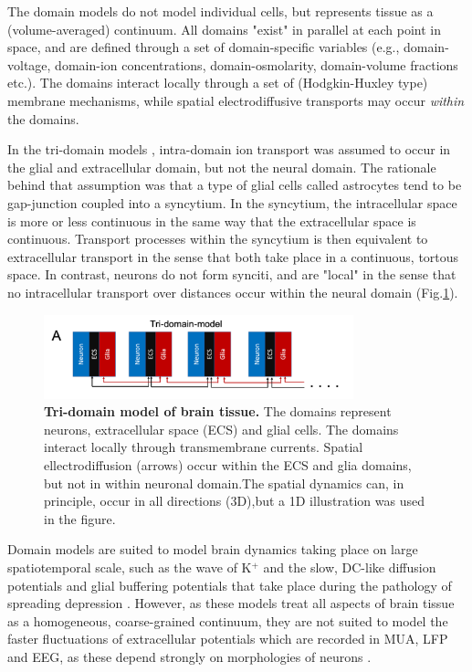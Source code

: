 The domain models do not model individual cells, but represents tissue as a (volume-averaged) continuum. All domains "exist" in parallel at each point in space, and are defined through a set of domain-specific variables (e.g., domain-voltage, domain-ion concentrations, domain-osmolarity, domain-volume fractions etc.). The domains interact locally through a set of (Hodgkin-Huxley type) membrane mechanisms, while spatial electrodiffusive transports may occur \textit{within} the domains. 

In the tri-domain models \citep{OConnell2016, tuttle2019}, intra-domain ion transport was assumed to occur in the glial and extracellular domain, but not the neural domain. The rationale behind that assumption was that a type of glial cells called astrocytes tend to be gap-junction coupled into a syncytium. In the syncytium, the intracellular space is more or less continuous in the same way that the extracellular space is continuous. Transport processes within the syncytium is then equivalent to extracellular transport in the sense that both take place in a continuous, tortous space. In contrast, neurons do not form synciti, and are "local" in the sense that no intracellular transport over distances occur within the neural domain (Fig.\ref{Eldiff:fig:domainmodel}). 

\begin{figure}[!ht]
\begin{center}
\includegraphics[width=0.8\textwidth]{Figures/Eldiff/Tridomain.png}
\end{center}
\caption{\textbf{Tri-domain model of brain tissue.} The domains represent neurons, extracellular space (ECS) and glial cells. The domains interact locally through transmembrane currents. Spatial ellectrodiffusion (arrows) occur within the ECS and glia domains, but not in within neuronal domain.The spatial dynamics can, in principle, occur in all directions (3D),but a 1D illustration was used in the figure. 
}
\label{Eldiff:fig:domainmodel}
\end{figure}

Domain models are suited to model brain dynamics taking place on large spatiotemporal scale, such as the wave of K$^+$ and the slow, DC-like diffusion potentials and glial buffering potentials that take place during the pathology of spreading depression \citep{Mori2015, OConnell2016, tuttle2019}. However, as these models treat all aspects of brain tissue as a homogeneous, coarse-grained continuum, they are not suited to model the faster fluctuations of extracellular potentials which are recorded in MUA, LFP and EEG, as these depend strongly on morphologies of neurons \citep{Einevoll2013}. 


